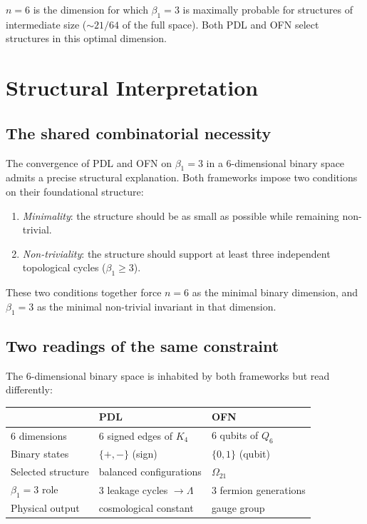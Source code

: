 \documentclass[11pt,a4paper]{article}
\begin{document}
$n = 6$ is the dimension for which $\beta_1 = 3$ is maximally probable for structures of intermediate size ($\sim 21/64$ of the full space). Both PDL and OFN select structures in this optimal dimension.

\section{Structural Interpretation}
\label{sec:interpretation}

\subsection{The shared combinatorial necessity}

The convergence of PDL and OFN on $\beta_1 = 3$ in a 6-dimensional binary space admits a precise structural explanation. Both frameworks impose two conditions on their foundational structure:
\begin{enumerate}
\item \emph{Minimality}: the structure should be as small as possible while remaining non-trivial.
\item \emph{Non-triviality}: the structure should support at least three independent topological cycles ($\beta_1 \geq 3$).
\end{enumerate}
These two conditions together force $n = 6$ as the minimal binary dimension, and $\beta_1 = 3$ as the minimal non-trivial invariant in that dimension.

\subsection{Two readings of the same constraint}

The 6-dimensional binary space is inhabited by both frameworks but read differently:

\begin{center}
\begin{tabular}{lll}
\toprule
 & PDL & OFN \\
\midrule
6 dimensions & 6 signed edges of $K_4$ & 6 qubits of $Q_6$ \\
Binary states & $\{+,-\}$ (sign) & $\{0,1\}$ (qubit) \\
Selected structure & balanced configurations & $\Omega_{21}$ \\
$\beta_1 = 3$ role & 3 leakage cycles $\to \Lambda$ & 3 fermion generations \\
Physical output & cosmological constant & gauge group \\
\bottomrule
\end{tabular}
\end{center}
\end{document}
